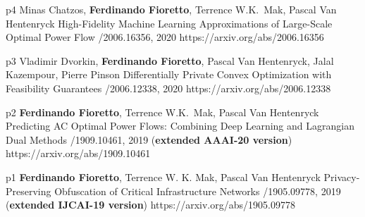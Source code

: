 \begin{pubs}
\wsentry
	{p4}%
	{Minas Chatzos, {\bf Ferdinando Fioretto}, Terrence W.K.~Mak, Pascal Van Hentenryck}
	{High-Fidelity Machine Learning Approximations of Large-Scale Optimal Power Flow}
	{/2006.16356, 2020}
	{https://arxiv.org/abs/2006.16356}


\wsentry
	{p3}%
	{Vladimir Dvorkin, {\bf Ferdinando Fioretto}, Pascal Van Hentenryck, Jalal Kazempour, Pierre Pinson}
	{Differentially Private Convex Optimization with Feasibility Guarantees}
	{/2006.12338, 2020}
	{https://arxiv.org/abs/2006.12338}

	



\wsentry
	{p2}%
	{{\bf Ferdinando Fioretto}, Terrence W.K.~Mak, Pascal Van Hentenryck}
	{Predicting AC Optimal Power Flows: Combining Deep Learning and Lagrangian Dual Methods}
	{/1909.10461, 2019 ({\bf extended AAAI-20 version})}
	{https://arxiv.org/abs/1909.10461}

\wsentry
	{p1}%
	{{\bf Ferdinando Fioretto}, Terrence W. K. Mak, Pascal Van Hentenryck}
	{Privacy-Preserving Obfuscation of Critical Infrastructure Networks} 
	{/1905.09778, 2019 ({\bf extended IJCAI-19 version})}
	{https://arxiv.org/abs/1905.09778}


\end{pubs}
